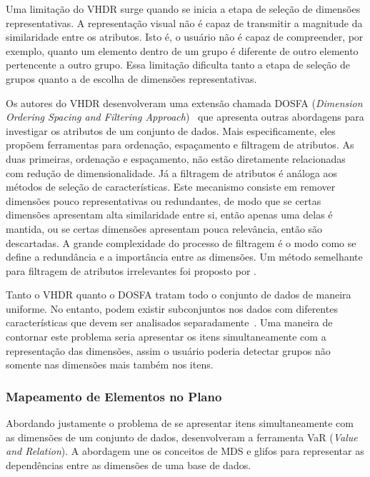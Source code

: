 Uma limitação do VHDR surge quando se inicia a etapa de
seleção de dimensões representativas. A representação visual
não é capaz de transmitir a magnitude da similaridade entre
os atributos. Isto é, o usuário não é capaz de compreender,
por exemplo, quanto um elemento dentro de um grupo é
diferente de outro elemento pertencente a outro grupo. Essa
limitação dificulta tanto a etapa de seleção de grupos
quanto a de escolha de dimensões representativas.

Os autores do VHDR desenvolveram uma extensão chamada DOSFA
(\emph{Dimension Ordering Spacing and Filtering
Approach})~\cite{DOSFA} que apresenta outras abordagens para
investigar os atributos de um conjunto de dados. Mais
especificamente, eles propõem ferramentas para ordenação,
espaçamento e filtragem de atributos. As duas primeiras,
ordenação e espaçamento, não estão diretamente relacionadas
com redução de dimensionalidade. Já a filtragem de atributos
é análoga aos métodos de seleção de características. Este
mecanismo consiste em remover dimensões pouco
representativas ou redundantes, de modo que se certas
dimensões apresentam alta similaridade entre si, então
apenas uma delas é mantida, ou se certas dimensões
apresentam pouca relevância, então são descartadas. A grande
complexidade do processo de filtragem é o modo como se
define a redundância e a importância entre as dimensões. Um
método semelhante para filtragem de atributos irrelevantes
foi proposto por \cite{Artero2006}.

Tanto o VHDR quanto o DOSFA tratam todo o conjunto de dados
de maneira uniforme. No entanto, podem existir subconjuntos
nos dados com diferentes características que devem ser
analisados separadamente~\cite{May2011}. Uma maneira de
contornar este problema seria apresentar os itens
simultaneamente com a representação das dimensões, assim o
usuário poderia detectar grupos não somente nas dimensões
mais também nos itens.

\subsubsection{Mapeamento de Elementos no Plano}

Abordando justamente o problema de se apresentar itens
simultaneamente com as dimensões de um conjunto de dados,
\cite{Yang2004} desenvolveram a ferramenta VaR (\emph{Value and
Relation}). A abordagem une os conceitos de MDS e glifos para
representar as dependências entre as dimensões de uma base
de dados. 

